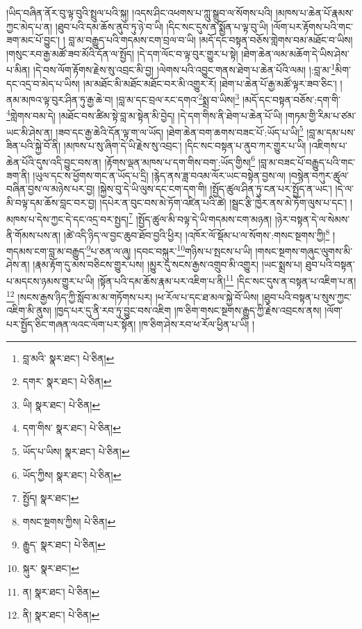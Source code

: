 །ཡིད་བཞིན་ནོར་བུ་ལྟ་བུའི་སྤྲུལ་པའི་སྐུ། །འདས་ཤིང་འཕགས་པ་ཀླུ་སྒྲུབ་ལ་སོགས་པའི། །མཁས་པ་ཆེན་པོ་རྣམས་ཀྱང་མེད་པ་ན། །ཐུབ་པའི་དམ་ཆོས་ནུབ་ཏུ་ཉེ་བ་ཡི། །དིང་སང་དུས་ན་སྨྱོན་པ་ལྟ་བུ་ཡི། །ལོག་པར་རྟོགས་པའི་གང་ཟག་མང་པོ་བྱུང་། །
བླ་མ་བརྒྱུད་པའི་གདམས་ངག་བྲལ་བ་ཡི། །མདོ་དང་བསྟན་བཅོས་གླེགས་བམ་མཐོང་བ་ཡིས། །གསུང་རབ་རྒྱ་མཚོ་ཟབ་མོའི་དོན་ལ་སྤྱོད། །དེ་དག་ལོང་བ་ལྟ་བུར་གྱུར་པ་སྟེ། །ཐེག་ཆེན་ལམ་མཆོག་དེ་ཡིས་ཤེས་པ་མིན། །དེ་བས་ལོག་རྟོགས་རྗེས་སུ་འབྲང་མི་བྱ། །ལེགས་པའི་འབྱུང་གནས་ཐེག་པ་ཆེན་པོའི་ལམ། །:བླ་མ་\footnote{བླ་མའི་  སྣར་ཐང་།  པེ་ཅིན། }མིག་དང་འདྲ་བ་མེད་པ་ཡིས། །མ་མཐོང་མི་མཐོང་མཐོང་བར་མི་འགྱུར་རོ། །ཐེག་པ་ཆེན་པོ་རྒྱ་མཚོ་ལྟར་ཟབ་ཅིང་། །ནམ་མཁའ་ལྟ་བུར་ཤིན་ཏུ་རྒྱ་ཆེ་བ། །བླ་མ་དང་བྲལ་རང་དགའ་\footnote{དགར་  སྣར་ཐང་།  པེ་ཅིན། }སྨྲ་བ་ཡིས།\footnote{ཡི།  སྣར་ཐང་།  པེ་ཅིན། } །མདོ་དང་བསྟན་བཅོས་:དག་གི་\footnote{དག་གིས་  སྣར་ཐང་།  པེ་ཅིན། }གླེགས་བམ་དེ། །མཐོང་བས་ཚིམ་སྟེ་བླ་མ་སྟེན་མི་བྱེད། །དེ་དག་གིས་ནི་ཐེག་པ་ཆེན་པོ་ཡི། །གཏམ་གྱི་རིམ་པ་ཙམ་ཡང་མི་ཤེས་ན། །ཟབ་དང་རྒྱ་ཆེའི་དོན་ལྟ་ག་ལ་ཡོད། །ཐེག་ཆེན་བག་ཆགས་བཟང་པོ་:ཡོད་པ་ཡི།\footnote{ཡོད་པ་ཡིས།  སྣར་ཐང་།  པེ་ཅིན། } །བླ་མ་དམ་པས་ཟིན་པའི་སྐྱེ་བོ་ནི། །མཁས་པ་སུ་ཞིག་དེ་ཡི་རྗེས་སུ་འབྲང་། །དིང་སང་བསྟན་པ་ནུབ་ཀར་གྱུར་པ་ཡི། །འཇིགས་པ་ཆེན་པོའི་དུས་འདི་བྱུང་བས་ན། །རྟོགས་ལྡན་མཁས་པ་དག་གིས་བག་:ཡོད་གྱིས།\footnote{ཡོད་ཀྱིས།  སྣར་ཐང་།  པེ་ཅིན། } །བླ་མ་བཟང་པོ་བརྒྱུད་པའི་གང་ཟག་ནི། །ཡུལ་དང་ས་ཕྱོགས་གང་ན་ཡོད་པ་དྲི། །རྙེད་ནས་ཟླ་བའམ་ལོར་ཡང་བསྟེན་བྱས་ལ། །བསྙེན་བཀུར་ཚུལ་བཞིན་བྱས་ལ་མཉེས་པར་བྱ། །སྐྱེས་བུ་དེ་ཡི་ལུས་དང་ངག་དག་གི། །སྤྱོད་ཚུལ་ཤིན་ཏུ་ངན་པར་སྤྱོད་ན་ཡང་། །དེ་ལ་མི་བལྟ་དམ་ཆོས་བླང་བར་བྱ། །དཔེར་ན་བུང་བས་མེ་ཏོག་འཛིན་པའི་ཚེ། །སྦྲང་རྩི་ཁྱེར་ནས་མེ་ཏོག་ལུས་པ་དང་། །མཁས་པ་དེས་ཀྱང་དེ་དང་འདྲ་བར་སྤྱད།\footnote{སྤྱོད།  སྣར་ཐང་། } །སྤྱོད་ཚུལ་མི་བལྟ་དེ་ཡི་གདམས་ངག་མཉན། །ཉེར་བསྟན་དེ་ལ་སེམས་ནི་གོམས་པས་ན། །ཚེ་འདི་ཉིད་ལ་བྱང་ཆུབ་ཐོབ་བྱའི་ཕྱིར། །འཁོར་ལོ་སྡོམ་པ་ལ་སོགས་:གསང་སྔགས་ཀྱི།\footnote{གསང་སྔགས་ཀྱིས།  པེ་ཅིན། } །གདམས་ངག་བླ་མ་བརྒྱུད་\footnote{རྒྱུད་  སྣར་ཐང་།  པེ་ཅིན། }པ་ཅན་ལ་ཞུ། །དབང་བསྐུར་\footnote{སྐུར་  སྣར་ཐང་། }གཉིས་པ་སྤངས་པ་ཡི། །གསང་སྔགས་གཞུང་ལུགས་མི་ཤེས་ན། །རྣམ་རྟོག་དུ་མས་བཅིངས་གྱུར་པས། །མྱུར་དུ་སངས་རྒྱས་འགྲུབ་མི་འགྱུར། །ཡང་སྨྲས་པ། ཐུབ་པའི་བསྟན་པ་མདངས་ཉམས་གྱུར་པ་ཡི། །སྟོན་པའི་དམ་ཆོས་རྣམ་པར་འཇིག་པ་ནི།\footnote{ན།  སྣར་ཐང་།  པེ་ཅིན། } །དིང་སང་དུས་ན་བསྟན་པ་འཇིག་པ་ན།\footnote{ནི།  སྣར་ཐང་།  པེ་ཅིན། } །སངས་རྒྱས་ཉིད་ཀྱི་སློབ་མ་མ་གཏོགས་པར། །ཕ་རོལ་པ་དང་ཐ་མལ་སྐྱེ་བོ་ཡིས། །ཐུབ་པའི་བསྟན་པ་སུས་ཀྱང་འཇིག་མི་ནུས། །ཁྱད་པར་དུ་ནི་རབ་ཏུ་བྱུང་བས་འཇིག །ཁ་ཅིག་གསང་སྔགས་རྒྱུད་ཀྱི་རྗེས་འབྲངས་ནས། །ལོག་པར་སྤྱོད་ཅིང་གཞན་ལའང་ལོག་པར་སྟོན། །ཁ་ཅིག་ཤེས་རབ་ཕ་རོལ་ཕྱིན་པ་ཡི། །
